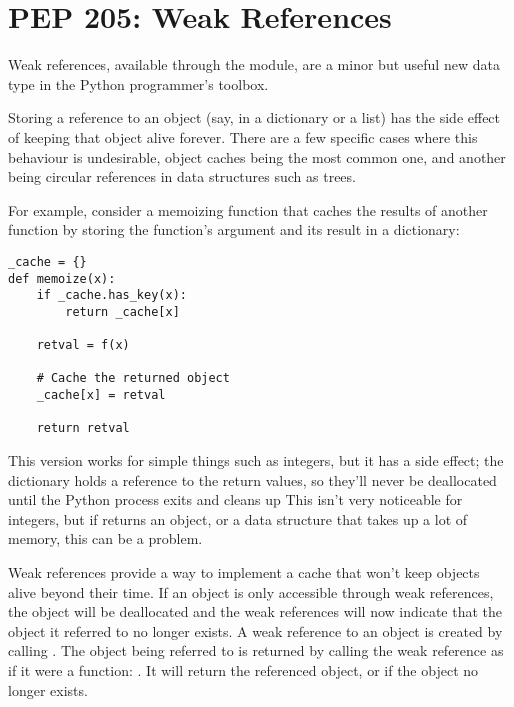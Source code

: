 \documentclass{howto}
\begin{document}
\begin{seealso} 


\end{seealso}

\section{PEP 205: Weak References}

Weak references, available through the  module, are a
minor but useful new data type in the Python programmer's toolbox.

Storing a reference to an object (say, in a dictionary or a list) has
the side effect of keeping that object alive forever.  There are a few
specific cases where this behaviour is undesirable, object caches
being the most common one, and another being circular references in
data structures such as trees.

For example, consider a memoizing function that caches the results of
another function  by storing the function's
argument and its result in a dictionary:

\begin{verbatim}
_cache = {}
def memoize(x):
    if _cache.has_key(x):
        return _cache[x]

    retval = f(x)

    # Cache the returned object
    _cache[x] = retval

    return retval
\end{verbatim}

This version works for simple things such as integers, but it has a
side effect; the  dictionary holds a reference to the
return values, so they'll never be deallocated until the Python
process exits and cleans up This isn't very noticeable for integers,
but if  returns an object, or a data structure that
takes up a lot of memory, this can be a problem.

Weak references provide a way to implement a cache that won't keep
objects alive beyond their time.  If an object is only accessible
through weak references, the object will be deallocated and the weak
references will now indicate that the object it referred to no longer
exists.  A weak reference to an object  is created by calling
.  The object being referred to is
returned by calling the weak reference as if it were a function:
.  It will return the referenced object, or  if
the object no longer exists. 
\end{document}
